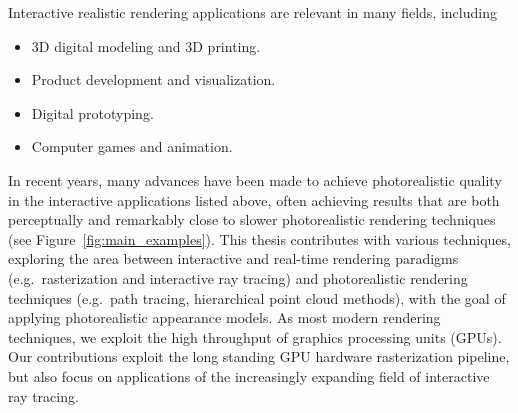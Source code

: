 Interactive realistic rendering applications are relevant in many fields, including
\begin{itemize}
\item 3D digital modeling and 3D printing.
\item Product development and visualization.
\item Digital prototyping.
\item Computer games and animation.
\end{itemize}
In recent years, many advances have been made to achieve photorealistic quality in the interactive applications listed above, often achieving results that are both perceptually and remarkably close to slower photorealistic rendering techniques (see Figure~\ref{fig:main_examples}). This thesis contributes with various techniques, exploring the area between interactive and real-time rendering paradigms (e.g.\ rasterization and interactive ray tracing) and photorealistic rendering techniques (e.g.\ path tracing, hierarchical point cloud methods), with the goal of applying photorealistic appearance models. As most modern rendering techniques, we exploit the high throughput of graphics processing units (GPUs). Our contributions exploit  the long standing GPU hardware rasterization pipeline, but also focus on applications of the increasingly expanding field of interactive ray tracing. 
\vspace{-2em}
%
